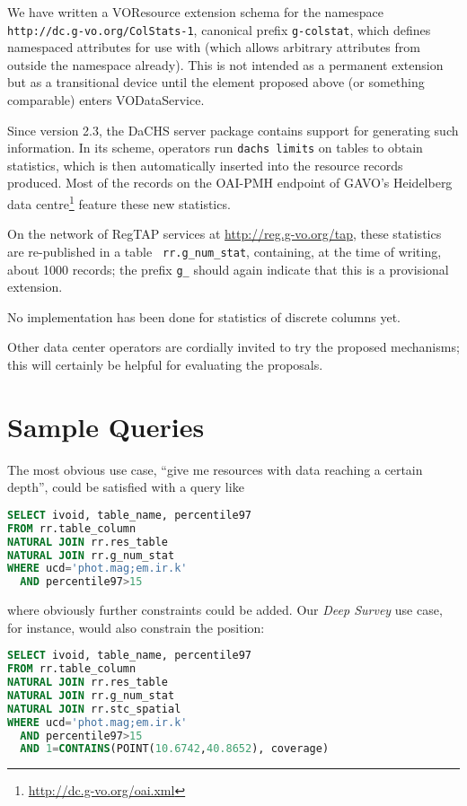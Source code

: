 \documentclass[11pt,a4paper]{ivoa}
\newcommand{\rtent}[1]{\texttt{\color{rtcolor} #1}}
\begin{document}
We have written a VOResource extension schema for the namespace
\nolinkurl{http://dc.g-vo.org/ColStats-1}, canonical prefix
\verb|g-colstat|, which defines namespaced attributes for use
with  (which allows arbitrary attributes from
outside the namespace already).  This is not intended as a permanent
extension but as a transitional device until the  element
proposed above (or something comparable) enters VODataService.

Since version 2.3, the DaCHS server package \citep{2014A+C.....7...27D}
contains support for
generating such information. In its scheme, operators run 
\verb|dachs limits| 
on tables to obtain statistics, which is then automatically
inserted into the resource records produced.  Most of the records on
the OAI-PMH endpoint of GAVO's Heidelberg data
centre\footnote{\url{http://dc.g-vo.org/oai.xml}} feature these new
statistics.

On the network of RegTAP services at \url{http://reg.g-vo.org/tap},
these
statistics are re-published in a table \rtent{rr.g\_num\_stat},
containing, at the time of writing, about 1000 records; the prefix
\verb|g_| should again indicate that this is a provisional extension.

No implementation has been done for statistics of discrete
columns yet.

Other data center operators are cordially invited to try the proposed
mechanisms; this will certainly be helpful for evaluating the proposals.


\section{Sample Queries}

The most obvious use case, ``give me resources with data reaching a
certain depth'', could be satisfied with a query like

\begin{lstlisting}[language=SQL]
SELECT ivoid, table_name, percentile97
FROM rr.table_column
NATURAL JOIN rr.res_table
NATURAL JOIN rr.g_num_stat
WHERE ucd='phot.mag;em.ir.k'
  AND percentile97>15
\end{lstlisting}

where obviously further constraints could be added.  Our \emph{Deep
Survey} use case, for instance, would also constrain the position:

\begin{lstlisting}[language=SQL]
SELECT ivoid, table_name, percentile97
FROM rr.table_column
NATURAL JOIN rr.res_table
NATURAL JOIN rr.g_num_stat
NATURAL JOIN rr.stc_spatial
WHERE ucd='phot.mag;em.ir.k'
  AND percentile97>15
  AND 1=CONTAINS(POINT(10.6742,40.8652), coverage)
\end{lstlisting}
\end{document}
